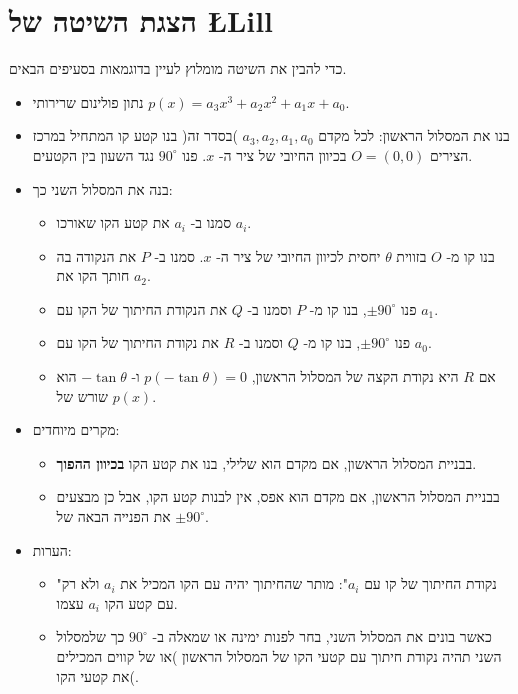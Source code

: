 
\section{הצגת השיטה של
\L{Lill}}\label{s.method}

כדי להבין את השיטה מומלוץ לעיין בדוגמאות בסעיפים הבאים.
\begin{itemize}
\item 
נתון פולינום שרירותי
$p(x)=a_3x^3+a_2x^2+a_1x+a_0$.
\item 
בנו את המסלול הראשון: לכל מקדם
$a_3,a_2,a_1,a_0$
)בסדר זה( בנו קטע קו המתחיל במרכז הצירים
$O=(0,0)$
בכיוון החיובי של ציר ה-%
$x$.
פנו
$90^\circ$
נגד השעון בין הקטעים.
\item 
בנה את המסלול השני כך:
\begin{itemize}
\item
סמנו ב-%
$a_i$
את קטע הקו שאורכו
$a_i$.
\item
בנו קו מ-%
$O$
בזווית 
$\theta$ 
יחסית לכיוון החיובי של ציר ה-%
$x$.
סמנו ב-%
$P$
את הנקודה בה חותך הקו את 
$a_2$.
\item
פנו
$\pm 90^\circ$,
בנו קו מ-%
$P$
וסמנו ב-%
$Q$
את הנקודת החיתוך של הקו עם
$a_1$.
\item
פנו
$\pm 90^\circ$,
בנו קו מ-%
$Q$
וסמנו ב-%
$R$
את נקודת החיתוך של הקו עם
$a_0$.
\item
אם 
$R$
היא נקודת הקצה של המסלול הראשון, 
$p(-\tan\theta)=0$
ו-%
$-\tan\theta$
הוא שורש של 
$p(x)$.
\end{itemize}
\item
מקרים מיוחדים:
\begin{itemize}
\item 
בבניית המסלול הראשון, אם מקדם הוא שלילי, בנו את קטע הקו
\textbf{בכיוון ההפוך}.
\item
בבניית המסלול הראשון, אם מקדם הוא אפס, אין לבנות קטע הקו, אבל כן מבצעים את הפנייה הבאה של
$\pm90^\circ$.
\end{itemize}
\item הערות:
\begin{itemize}
\item 
"נקודת החיתוך של קו עם
$a_i$":
מותר שהחיתוך יהיה עם הקו המכיל את
$a_i$
ולא רק עם קטע הקו 
$a_i$
עצמו.
\item
כאשר בונים את המסלול השני, בחר לפנות ימינה או שמאלה ב-%
$90^\circ$
כך שלמסלול השני תהיה נקודת חיתוך עם קטעי הקו של המסלול הראשון )או של קווים המכילים את קטעי הקו(.
\end{itemize}
\end{itemize}

